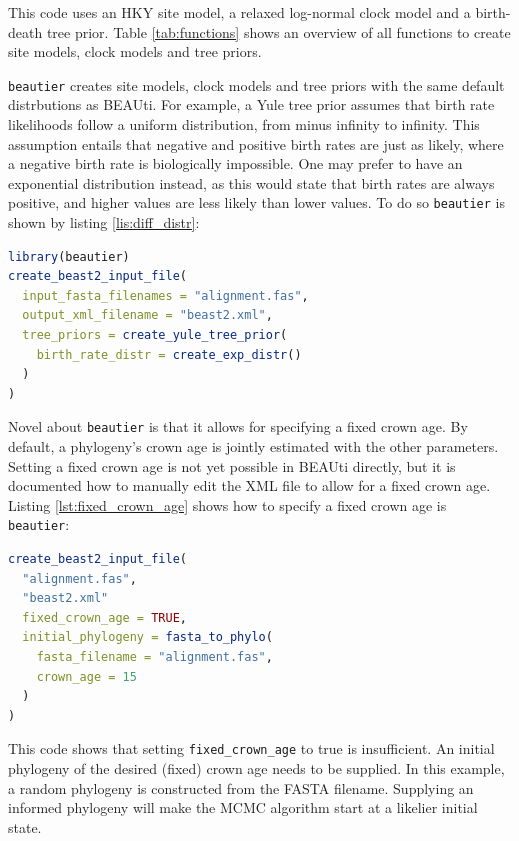 \documentclass{article}
\begin{document}
This code uses an HKY site model, a relaxed log-normal clock model and a birth-death tree prior.
Table \ref{tab:functions} shows an overview of all functions to create site models, clock models and tree priors.

\verb;beautier; creates site models, clock models and tree priors with the same default distrbutions as BEAUti.
For example, a Yule tree prior assumes that birth rate likelihoods follow a uniform distribution, from minus infinity
to infinity. This assumption entails that negative and positive birth rates are just as likely, where a negative birth rate is biologically impossible. 
One may prefer to have an exponential distribution instead, as this would state that birth rates are always positive, and
higher values are less likely than lower values. To do so \verb;beautier; is shown by listing \ref{lis:diff_distr}:


\begin{lstlisting}[language=R, caption=Example with Yule tree prior with different birth rate distribution, label=lst:diff_distr, floatplacement=H]
library(beautier)
create_beast2_input_file(
  input_fasta_filenames = "alignment.fas",
  output_xml_filename = "beast2.xml",
  tree_priors = create_yule_tree_prior(
    birth_rate_distr = create_exp_distr()    
  )
)
\end{lstlisting}

Novel about \verb;beautier; is that it allows for specifying a fixed crown age. 
By default, a phylogeny's crown age is jointly estimated with the other parameters.
Setting a fixed crown age is not yet possible in BEAUti directly, but it is documented how to 
manually edit the XML file to allow for a fixed crown age. Listing \ref{lst:fixed_crown_age} shows how to specify a fixed crown age is \verb;beautier;:

\begin{lstlisting}[language=R, caption=Example with fixed crown age, label=lst:fixed_crown_age, floatplacement=H]
create_beast2_input_file(
  "alignment.fas",
  "beast2.xml"
  fixed_crown_age = TRUE,
  initial_phylogeny = fasta_to_phylo(
    fasta_filename = "alignment.fas", 
    crown_age = 15
  )
)
\end{lstlisting}

This code shows that setting \verb;fixed_crown_age; to true is insufficient. An
initial phylogeny of the desired (fixed) crown age needs to be supplied. In this
example, a random phylogeny is constructed from the FASTA filename. Supplying an 
informed phylogeny will make the MCMC algorithm start at a likelier initial state.
\end{document}
